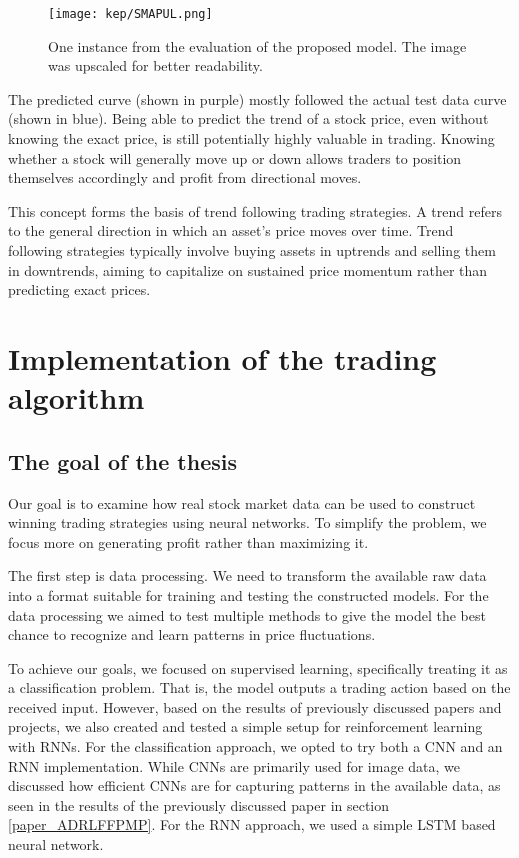 \documentclass[a4paper,oneside,onecolumn,12pt]{book}
\begin{document}
	\begin{figure}[H]
	\begin{center}
		\texttt{[image: kep/SMAPUL.png]}
		\caption{One instance from the evaluation of the proposed model. The image was upscaled for better readability.}
		\label{fig:evalutaion_SMAPUL}
	\end{center}
	\end{figure}
	The predicted curve (shown in purple) mostly followed the actual test data curve (shown in blue). Being able to predict the trend of a stock price, even without knowing the exact price, is still potentially highly valuable in trading. Knowing whether a stock will generally move up or down allows traders to position themselves accordingly and profit from directional moves.

	This concept forms the basis of trend following trading strategies. A trend refers to the general direction in which an asset's price moves over time. Trend following strategies typically involve buying assets in uptrends and selling them in downtrends, aiming to capitalize on sustained price momentum rather than predicting exact prices. \cite{TFTSS}

\chapter{Implementation of the trading algorithm}

\section{The goal of the thesis}
	Our goal is to examine how real stock market data can be used to construct winning trading strategies using neural networks. To simplify the problem, we focus more on generating profit rather than maximizing it.

	The first step is data processing. We need to transform the available raw data into a format suitable for training and testing the constructed models. For the data processing we aimed to test multiple methods to give the model the best chance to recognize and learn patterns in price fluctuations.

	To achieve our goals, we focused on supervised learning, specifically treating it as a classification problem. That is, the model outputs a trading action based on the received input. However, based on the results of previously discussed papers and projects, we also created and tested a simple setup for reinforcement learning with RNNs. For the classification approach, we opted to try both a CNN and an RNN implementation. While CNNs are primarily used for image data, we discussed how efficient CNNs are for capturing patterns in the available data, as seen in the results of the previously discussed paper in section \ref{paper_ADRLFFPMP}. For the RNN approach, we used a simple LSTM based neural network.
\end{document}
